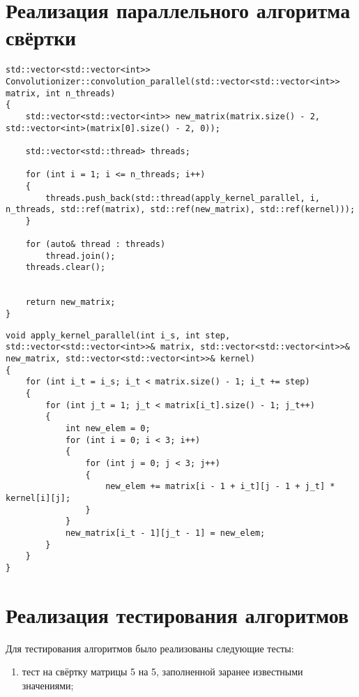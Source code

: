 \section{Реализация параллельного алгоритма свёртки}

\begin{lstlisting}[label=some-code-3,caption=Реализация параллельного алгоритма свёртки в виде метода класса Convolutionizer]
std::vector<std::vector<int>> Convolutionizer::convolution_parallel(std::vector<std::vector<int>> matrix, int n_threads)
{
	std::vector<std::vector<int>> new_matrix(matrix.size() - 2, std::vector<int>(matrix[0].size() - 2, 0));

	std::vector<std::thread> threads;

	for (int i = 1; i <= n_threads; i++)
	{
		threads.push_back(std::thread(apply_kernel_parallel, i, n_threads, std::ref(matrix), std::ref(new_matrix), std::ref(kernel)));
	}

	for (auto& thread : threads)
		thread.join();
	threads.clear();


	return new_matrix;
}
\end{lstlisting}


\begin{lstlisting}[label=some-code-4,caption=Реализация функции применения ядра к матрице]
void apply_kernel_parallel(int i_s, int step, std::vector<std::vector<int>>& matrix, std::vector<std::vector<int>>& new_matrix, std::vector<std::vector<int>>& kernel)
{
	for (int i_t = i_s; i_t < matrix.size() - 1; i_t += step)
	{
		for (int j_t = 1; j_t < matrix[i_t].size() - 1; j_t++)
		{
			int new_elem = 0;
			for (int i = 0; i < 3; i++)
			{
				for (int j = 0; j < 3; j++)
				{
					new_elem += matrix[i - 1 + i_t][j - 1 + j_t] * kernel[i][j];
				}
			}
			new_matrix[i_t - 1][j_t - 1] = new_elem;
		}
	}
}
\end{lstlisting}

\section{Реализация тестирования алгоритмов}

Для тестирования алгоритмов было реализованы следующие тесты:
\begin{enumerate}
	\item тест на свёртку матрицы 5 на 5, заполненной заранее известными значениями;
\end{enumerate}

